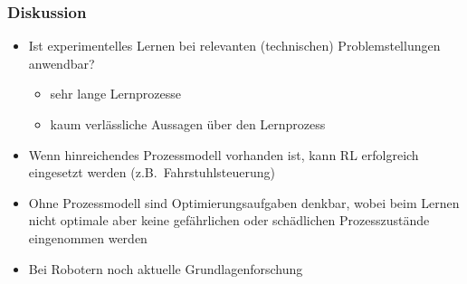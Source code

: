\subsubsection{Diskussion}
\begin{itemize}
	\item Ist experimentelles Lernen bei relevanten (technischen) Problemstellungen anwendbar?
	\begin{itemize}
		\item sehr lange Lernprozesse
		\item kaum verlässliche Aussagen über den Lernprozess
	\end{itemize}
	\item Wenn hinreichendes Prozessmodell vorhanden ist, kann RL erfolgreich eingesetzt werden (z.B.\ Fahrstuhlsteuerung)
	\item Ohne Prozessmodell sind Optimierungsaufgaben denkbar, wobei beim Lernen nicht optimale aber keine gefährlichen oder schädlichen Prozesszustände eingenommen werden
	\item Bei Robotern noch aktuelle Grundlagenforschung
\end{itemize}